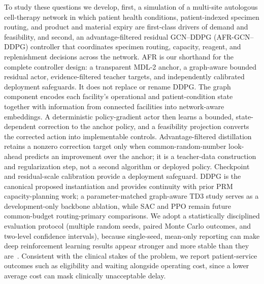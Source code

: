 \documentclass[preprint,review,12pt]{elsarticle}
\begin{document}
To study these questions we develop, first, a simulation of a multi-site autologous cell-therapy network in which patient health conditions, patient-indexed specimen routing, and product and material expiry are first-class drivers of demand and feasibility, and second, an advantage-filtered residual GCN--DDPG (AFR-GCN--DDPG) controller that coordinates specimen routing, capacity, reagent, and replenishment decisions across the network. AFR is our shorthand for the complete controller design: a transparent MDL-2 anchor, a graph-aware bounded residual actor, evidence-filtered teacher targets, and independently calibrated deployment safeguards. It does not replace or rename DDPG. The graph component encodes each facility's operational and patient-condition state together with information from connected facilities into network-aware embeddings. A deterministic policy-gradient actor then learns a bounded, state-dependent correction to the anchor policy, and a feasibility projection converts the corrected action into implementable controls. Advantage-filtered distillation retains a nonzero correction target only when common-random-number look-ahead predicts an improvement over the anchor; it is a teacher-data construction and regularization step, not a second algorithm or deployed policy. Checkpoint and residual-scale calibration provide a deployment safeguard. DDPG is the canonical proposed instantiation and provides continuity with prior PRM capacity-planning work; a parameter-matched graph-aware TD3 study serves as a development-only backbone ablation, while SAC and PPO remain future common-budget routing-primary comparisons. We adopt a statistically disciplined evaluation protocol (multiple random seeds, paired Monte Carlo outcomes, and two-level confidence intervals), because single-seed, mean-only reporting can make deep reinforcement learning results appear stronger and more stable than they are~\cite{Henderson2018DRLMatters, Agarwal2021RLiable}. Consistent with the clinical stakes of the problem, we report patient-service outcomes such as eligibility and waiting alongside operating cost, since a lower average cost can mask clinically unacceptable delay.
\end{document}
